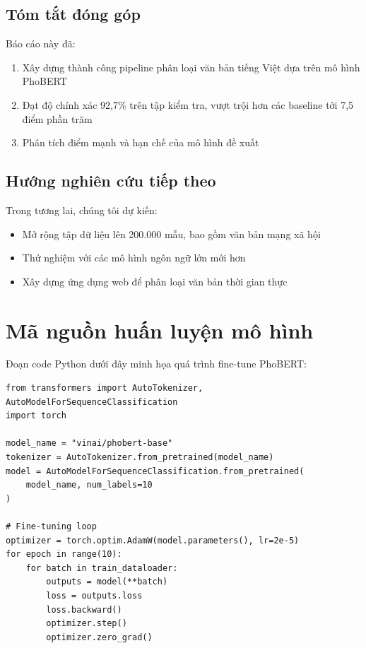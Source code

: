 \documentclass[12pt, a4paper]{report}
\begin{document}
\section{Tóm tắt đóng góp}

Báo cáo này đã:
\begin{enumerate}
  \item Xây dựng thành công pipeline phân loại văn bản tiếng Việt
        dựa trên mô hình PhoBERT
  \item Đạt độ chính xác 92{,}7\% trên tập kiểm tra, vượt trội hơn
        các baseline tới 7{,}5 điểm phần trăm
  \item Phân tích điểm mạnh và hạn chế của mô hình đề xuất
\end{enumerate}

\section{Hướng nghiên cứu tiếp theo}

Trong tương lai, chúng tôi dự kiến:
\begin{itemize}
  \item Mở rộng tập dữ liệu lên 200.000 mẫu, bao gồm văn bản mạng xã hội
  \item Thử nghiệm với các mô hình ngôn ngữ lớn mới hơn
  \item Xây dựng ứng dụng web để phân loại văn bản thời gian thực
\end{itemize}

\printbibliography[title={Tài liệu tham khảo}]

\appendix

\chapter{Mã nguồn huấn luyện mô hình}
\label{app:code}

Đoạn code Python dưới đây minh họa quá trình fine-tune PhoBERT:

\begin{verbatim}
from transformers import AutoTokenizer, AutoModelForSequenceClassification
import torch

model_name = "vinai/phobert-base"
tokenizer = AutoTokenizer.from_pretrained(model_name)
model = AutoModelForSequenceClassification.from_pretrained(
    model_name, num_labels=10
)

# Fine-tuning loop
optimizer = torch.optim.AdamW(model.parameters(), lr=2e-5)
for epoch in range(10):
    for batch in train_dataloader:
        outputs = model(**batch)
        loss = outputs.loss
        loss.backward()
        optimizer.step()
        optimizer.zero_grad()
\end{verbatim}
\end{document}

